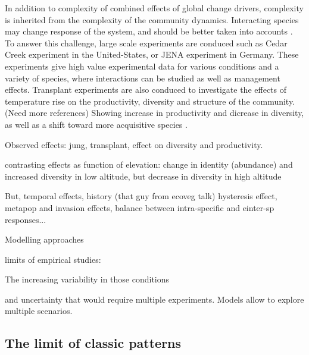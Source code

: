  In addition to complexity of combined effects of global change drivers, complexity is inherited from the complexity of the community dynamics. Interacting species may change response of the system, and should be better taken into accounts \parencite{gilman_framework_2010}. To answer this challenge, large scale experiments are conduced such as Cedar Creek experiment in the United-States, or JENA experiment in Germany. These experiments give high value experimental data for various conditions and a variety of species, where interactions can be studied as well as management effects.
 Transplant experiments are also conduced to investigate the effects of temperature rise on the productivity, diversity and structure of the community. (Need more references) Showing increase in productivity and dicrease in diversity, as well as a shift toward more acquisitive species \parencite{debouk_functional_2015}.
 
 Observed effects: jung, transplant, effect on diversity and productivity.
 
contrasting effects as function of elevation: change in identity (abundance) and increased diversity in low altitude, but decrease in diversity in high altitude \parencite{rosbakh_elevation_2014}
 
 But, temporal effects, history (that guy from ecoveg talk) hysteresis effect, metapop and invasion effects, balance between intra-specific and einter-sp responses...
 
 Modelling approaches   
 
 
limits of empirical studies: \parencite{merila_climate_2014}

 
 \parencite{schirpke_multiple_2012}

 The increasing variability in those conditions 
 
 and uncertainty that would require multiple experiments. Models allow to explore multiple scenarios.
 
%

\subsection{The limit of classic patterns}

